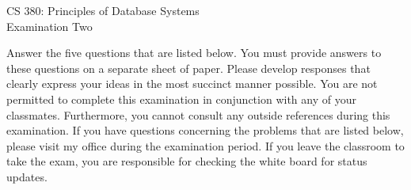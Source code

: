 \documentclass[12pt]{article}
\def\widow#1{\vskip #1\vbadness10000\penalty-200\vskip-#1}
\begin{document}
\def\widow#1{\vskip #1\vbadness10000\penalty-200\vskip-#1}

\begin{center}

  CS 380: Principles of Database Systems \\
  Examination Two \\

  \end{center}

  \noindent
  Answer the five questions that are listed below.  You must provide
  answers to these questions on a separate sheet of paper.  Please
  develop responses that clearly express your ideas in the most succinct
  manner possible.  You are not permitted to complete this examination
  in conjunction with any of your classmates.  Furthermore, you cannot
  consult any outside references during this examination.  If you have
  questions concerning the problems that are listed below, please visit
  my office during the examination period.  If you leave the classroom
  to take the exam, you are responsible for checking the white board for
  status updates.
\end{document}

